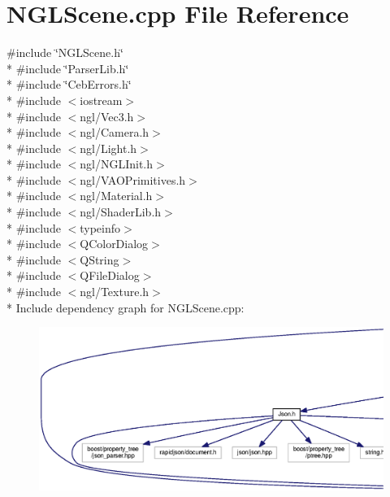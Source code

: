 \section{N\-G\-L\-Scene.\-cpp File Reference}
\label{_n_g_l_scene_8cpp}
{\ttfamily \#include \char`\"{}N\-G\-L\-Scene.\-h\char`\"{}}\\*
{\ttfamily \#include \char`\"{}Parser\-Lib.\-h\char`\"{}}\\*
{\ttfamily \#include \char`\"{}Ceb\-Errors.\-h\char`\"{}}\\*
{\ttfamily \#include $<$iostream$>$}\\*
{\ttfamily \#include $<$ngl/\-Vec3.\-h$>$}\\*
{\ttfamily \#include $<$ngl/\-Camera.\-h$>$}\\*
{\ttfamily \#include $<$ngl/\-Light.\-h$>$}\\*
{\ttfamily \#include $<$ngl/\-N\-G\-L\-Init.\-h$>$}\\*
{\ttfamily \#include $<$ngl/\-V\-A\-O\-Primitives.\-h$>$}\\*
{\ttfamily \#include $<$ngl/\-Material.\-h$>$}\\*
{\ttfamily \#include $<$ngl/\-Shader\-Lib.\-h$>$}\\*
{\ttfamily \#include $<$typeinfo$>$}\\*
{\ttfamily \#include $<$Q\-Color\-Dialog$>$}\\*
{\ttfamily \#include $<$Q\-String$>$}\\*
{\ttfamily \#include $<$Q\-File\-Dialog$>$}\\*
{\ttfamily \#include $<$ngl/\-Texture.\-h$>$}\\*
Include dependency graph for N\-G\-L\-Scene.\-cpp\-:\nopagebreak
\begin{figure}[H]
\begin{center}
\leavevmode
\includegraphics[width=350pt]{_n_g_l_scene_8cpp__incl}
\end{center}
\end{figure}
